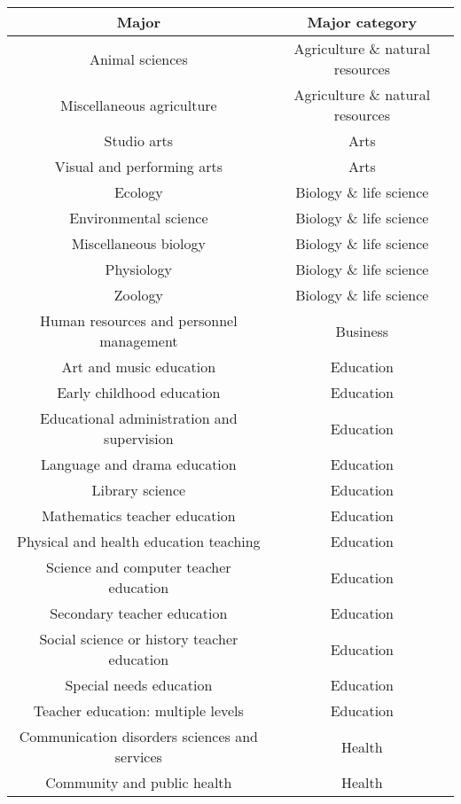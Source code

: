 \documentclass[11pt]{article}
\begin{document}
\begin{center}
    \begin{longtable} {|| c c ||}
    \hline
    Major & Major category \\ [0.5ex]
    \hline\hline
    Animal sciences & Agriculture \& natural resources \\
    \hline
    Miscellaneous agriculture & Agriculture \& natural resources \\
    \hline
    Studio arts & Arts \\
    \hline
    Visual and performing arts & Arts \\
    \hline
    Ecology & Biology \& life science \\
    \hline
    Environmental science & Biology \& life science \\
    \hline
    Miscellaneous biology & Biology \& life science \\
    \hline
    Physiology & Biology \& life science \\
    \hline
    Zoology & Biology \& life science \\
    \hline
    Human resources and personnel management & Business \\
    \hline
    Art and music education & Education \\
    \hline
    Early childhood education & Education \\
    \hline
    Educational administration and supervision & Education \\
    \hline
    Language and drama education & Education \\
    \hline
    Library science & Education \\
    \hline
    Mathematics teacher education & Education \\
    \hline
    Physical and health education teaching & Education \\
    \hline
    Science and computer teacher education & Education \\
    \hline
    Secondary teacher education & Education \\
    \hline
    Social science or history teacher education & Education \\
    \hline
    Special needs education & Education \\
    \hline
    Teacher education: multiple levels & Education \\
    \hline
    Communication disorders sciences and services & Health \\
    \hline
    Community and public health & Health \\

\end{longtable}
\end{center}
\end{document}
